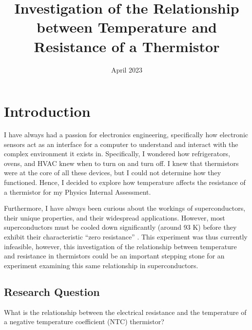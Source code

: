 \documentclass[11pt]{article}
\title{Investigation of the Relationship between Temperature and Resistance of a Thermistor}
\author{\censor{Saptak Das}}
\date{April 2023}
\begin{document}
\maketitle

\section{Introduction}
\label{section:introduction}
I have always had a passion for electronics engineering, specifically how electronic sensors act as an interface for a computer to understand and interact with the complex environment it exists in. Specifically, I wondered how refrigerators, ovens, and HVAC knew when to turn on and turn off. I knew that thermistors were at the core of all these devices, but I could not determine how they functioned. Hence, I decided to explore how temperature affects the resistance of a thermistor for my Physics Internal Assessment.

Furthermore, I have always been curious about the workings of superconductors, their unique properties, and their widespread applications. However, most superconductors must be cooled down significantly (around 93 K) before they exhibit their characteristic “zero resistance” \citep{butera1997dependence}. This experiment was thus currently infeasible, however, this investigation of the relationship between temperature and resistance in thermistors could be an important stepping stone for an experiment examining this same relationship in superconductors.

\subsection{Research Question}
What is the relationship between the electrical resistance and the temperature of a negative temperature coefficient (NTC) thermistor? 











\newpage


\end{document}
